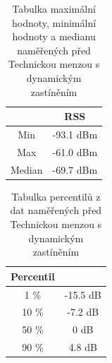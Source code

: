 \begin{table}[h!]
\centering
\begin{tabular}{|c|c|}
  \hline
   & RSS \\
  \hline
  Min & -93.1 dBm\\
  \hline
  Max & -61.0 dBm\\
  \hline
  Median & -69.7 dBm \\
  \hline
\end{tabular}
\caption{Tabulka maximální hodnoty, minimální hodnoty a medianu naměřených před Technickou menzou s dynamickým zastíněním}
\end{table}
\clearpage
\begin{table}[h!]
\centering
\begin{tabular}{|c|c|}
  \hline
   Percentil &  \\
  \hline
  1 \% & -15.5 dB\\
  \hline
  10 \% & -7.2 dB\\
  \hline
  50 \% & 0 dB \\
  \hline
  90 \% & 4.8 dB \\
  \hline
\end{tabular}
\caption{Tabulka percentilů z dat naměřených před Technickou menzou s dynamickým zastíněním}
\end{table}





